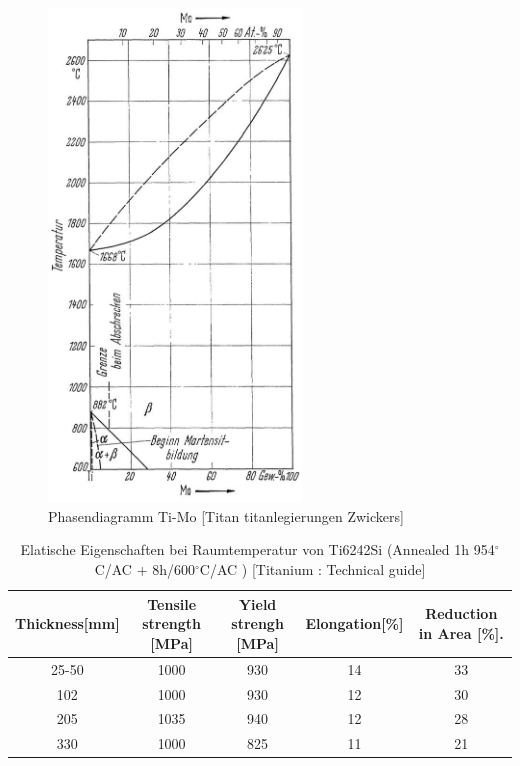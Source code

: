 \begin{figure}[H]
	\centering
	\includegraphics[width= 0.6\textwidth]{Bilder/TiMo}
	\caption{Phasendiagramm Ti-Mo [Titan titanlegierungen Zwickers]}
	\label{TiMo}
\end{figure}

\begin{table}[H]
	\small
	\tabcolsep=0.09cm
	\centering	
	\begin{tabular}{|c |c |c|c |c|}
		\hline
		\centering
		Thickness[mm] & Tensile strength [MPa] & Yield strengh [MPa] & Elongation[\%]& Reduction in Area [\%]. \\
		\hline
		25-50&1000&930&14&33\\
		102&1000&930&12&30\\
		205&1035&940&12&28\\
		330&1000&825&11&21\\
		
		\hline
	\end{tabular}
	\caption{Elatische Eigenschaften bei Raumtemperatur von Ti6242Si (Annealed 1h 954$^\circ$C/AC + 8h/600$^\circ$C/AC )  [Titanium : Technical guide]}
	\label{Mecprop}
\end{table}






